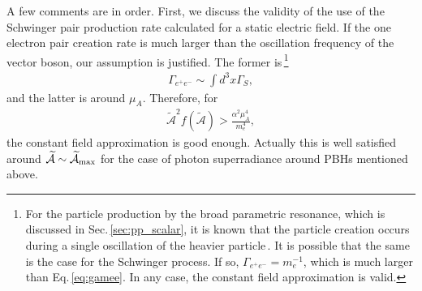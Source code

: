 \documentclass[%
 preprint,
 nofootinbib,
 amsmath,amssymb,
 aps,
 a4paper
]{revtex4-1}
\begin{document}
A few comments are in order.
First, we discuss the validity of the use of the Schwinger pair production rate calculated for a static electric field. If the one electron pair creation rate is much larger than the oscillation frequency of the vector boson, our assumption is justified. The former is\,\footnote{For the particle production by the broad parametric resonance, which is discussed in Sec.\,\ref{sec:pp_scalar}, it is known that the particle creation occurs during a single oscillation of the heavier particle\,\cite{Kofman:1997yn}. It is possible that the same is the case for the Schwinger process. If so, $\Gamma_{e^+e^-} = m_e^{-1}$, which is much larger than Eq.\,\eqref{eq:gamee}. In any case, the constant field approximation is valid.}
\begin{align}
\label{eq:gamee}
    \Gamma_{e^+e^-} \sim \int d^3x \Gamma_S,
\end{align}
and the latter is around $\mu_A$. Therefore, for
\begin{align}
    \widetilde{\mathcal A}^2 f(\widetilde{\mathcal A}) > \frac{\alpha^2 \mu_A^4}{m_e^4},
\end{align}
the constant field approximation is good enough. Actually this is well satisfied around $\widetilde{\mathcal A} \sim \widetilde{\mathcal A}_{\rm max}$ for the case of photon superradiance around PBHs mentioned above.
\end{document}
